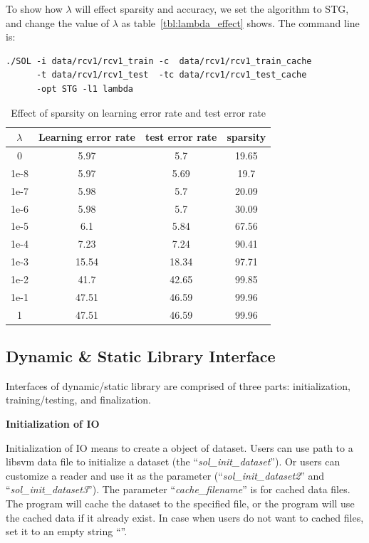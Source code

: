 \documentclass[11pt,a4paper]{article}
\begin{document}
To show how $\lambda$ will effect sparsity and accuracy, we set the algorithm
to STG, and change the value of $\lambda$ as table~\ref{tbl:lambda_effect} shows.
The command line is:
\lstset{language=bash,}
\begin{lstlisting}
./SOL -i data/rcv1/rcv1_train -c  data/rcv1/rcv1_train_cache 
      -t data/rcv1/rcv1_test  -tc data/rcv1/rcv1_test_cache 
      -opt STG -l1 lambda
\end{lstlisting}

\begin{table}[!h]
    \label{tbl:lambda_effect}
    \centering
    \begin{tabular}{|c|c|c|c|}
        \hline
        $\lambda$ & Learning error rate & test error rate & sparsity \\
        \hline
        0 & 5.97 & 5.7 & 19.65 \\
        1e-8 & 5.97 & 5.69 & 19.7 \\
        1e-7 & 5.98 & 5.7 & 20.09 \\
        1e-6 & 5.98 & 5.7 & 30.09 \\
        1e-5 & 6.1 & 5.84 & 67.56 \\
        1e-4 & 7.23 & 7.24 & 90.41 \\
        1e-3 & 15.54 & 18.34 & 97.71 \\
        1e-2 & 41.7 & 42.65 & 99.85\\
        1e-1 & 47.51 & 46.59 & 99.96 \\
        1 & 47.51 & 46.59 & 99.96 \\
        \hline
    \end{tabular}
    \caption{Effect of sparsity on learning error rate and test error rate}
    \label{tab:effect_lambda}
\end{table}

\subsection{Dynamic \& Static Library Interface}
Interfaces of dynamic/static library are comprised of three parts:
initialization, training/testing, and finalization.

\hspace{-5mm}\textbf{Initialization of IO}
\vspace{2mm}

Initialization of IO means to create a object of dataset. Users can use 
path to a libsvm data file to initialize a dataset (the ``\emph{sol\_init\_dataset}''). Or users can customize a reader
and use it as the parameter (``\emph{sol\_init\_dataset2}'' and
``\emph{sol\_init\_dataset3}''). The parameter ``\emph{cache\_filename}'' is for
cached data files. The program will cache the dataset to the specified file, or
the program will use the cached data if it already exist. In case when users do
not want to cached files, set it to an empty string ``''.
\end{document}
